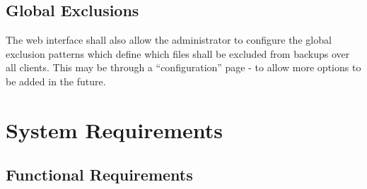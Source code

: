 \subsection{Global Exclusions}

The web interface shall also allow the administrator to configure the global
exclusion patterns which define which files shall be excluded from backups over
all clients. This may be through a ``configuration'' page - to allow more
options to be added in the future.


\section{System Requirements}
\label{sec:specification-system-requirements}

\subsection{Functional Requirements}

